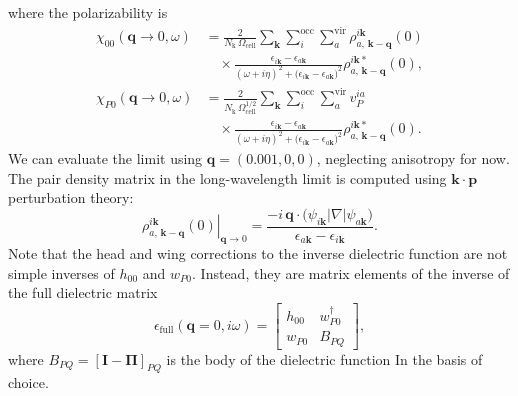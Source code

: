 where the polarizability is
\begin{align}
\chi_{00}(\mathbf{q} \rightarrow 0, \omega)
  &= \frac{2}{N_{\mathrm{k}}\,\Omega_{\text{cell}}}
     \sum_{\mathbf{k}}
     \sum_i^{\text{occ}}
     \sum_a^{\text{vir}}
     \rho_{a,\,\mathbf{k}-\mathbf{q}}^{i\mathbf{k}}(0)
     \tag{49} \\
  &\quad \times
     \frac{\epsilon_{i\mathbf{k}}-\epsilon_{a\mathbf{k}}}
          {\left(\omega+i\eta\right)^2+\bigl(\epsilon_{i\mathbf{k}}-\epsilon_{a\mathbf{k}}\bigr)^2}
     \rho_{a,\,\mathbf{k}-\mathbf{q}}^{i\mathbf{k}*}(0), \\
\chi_{P0}(\mathbf{q} \rightarrow 0, \omega)
  &= \frac{2}{N_{\mathrm{k}}\,\Omega_{\text{cell}}^{1/2}}
     \sum_{\mathbf{k}}
     \sum_i^{\text{occ}}
     \sum_a^{\text{vir}}
     v_P^{ia}
     \tag{50} \\
  &\quad \times
     \frac{\epsilon_{i\mathbf{k}}-\epsilon_{a\mathbf{k}}}
          {\left(\omega+i\eta\right)^2+\bigl(\epsilon_{i\mathbf{k}}-\epsilon_{a\mathbf{k}}\bigr)^2}
     \rho_{a,\,\mathbf{k}-\mathbf{q}}^{i\mathbf{k}*}(0).
\end{align}
We can  evaluate the limit using
$\mathbf{q}=(0.001,0,0)$, neglecting anisotropy for now. 
The pair density matrix in the long-wavelength limit is computed using
$\mathbf{k}\cdot\mathbf{p}$ perturbation theory:
\begin{equation}
\left.\rho_{a,\,\mathbf{k}-\mathbf{q}}^{i\mathbf{k}}(0)\right|_{\mathbf{q} \rightarrow 0}
  = \frac{-i\,\mathbf{q}\cdot
          \bigl(\psi_{i\mathbf{k}}\lvert\nabla\rvert\psi_{a\mathbf{k}}\bigr)}
         {\epsilon_{a\mathbf{k}}-\epsilon_{i\mathbf{k}}}.
\tag{51}
\end{equation}
Note that the head and wing corrections to the inverse dielectric function are not simple inverses of $h_{00}$ and $w_{P0}$.
Instead, they are matrix elements of the inverse of the full dielectric
matrix
\begin{equation}
\epsilon_{\mathrm{full}}(\mathbf{q}=0, i \omega)
  = \begin{bmatrix}
      h_{00}        & w_{P0}^{\dagger} \\
      w_{P0}        & B_{PQ}
    \end{bmatrix},
\tag{52}
\end{equation}
where $B_{PQ} = [\mathbf{I}-\mathbf{\Pi}]_{PQ}$ is the body of the
dielectric function In the basis of choice.
